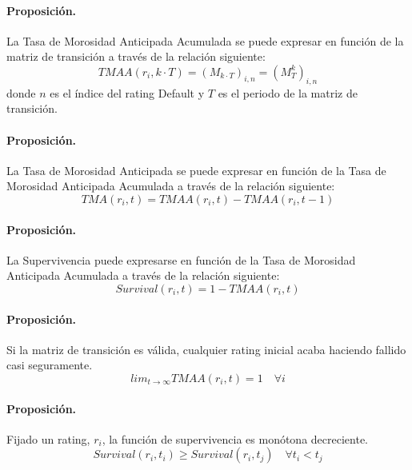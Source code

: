 \paragraph{Proposici\'on.} La Tasa de Morosidad Anticipada Acumulada se 
puede expresar en funci\'on de la matriz de transici\'on a trav\'es de la
relaci\'on siguiente:
\begin{displaymath}
TMAA(r_i,k \cdot T) = (M_{k \cdot T})_{i,n} = (M_{T}^{k})_{i,n}
\end{displaymath}
donde $n$ es el \'indice del rating Default y $T$ es el periodo de la matriz
de transici\'on.

\paragraph{Proposici\'on.} La Tasa de Morosidad Anticipada se puede expresar 
en funci\'on de la Tasa de Morosidad Anticipada Acumulada a trav\'es de la
relaci\'on siguiente:
\begin{displaymath}
TMA(r_i, t) =  TMAA(r_i, t) - TMAA(r_i, t-1)
\end{displaymath}

\paragraph{Proposici\'on.} La Supervivencia puede expresarse en funci\'on de
la Tasa de Morosidad Anticipada Acumulada a trav\'es de la relaci\'on siguiente:
\begin{displaymath}
Survival(r_i, t) =  1 - TMAA(r_i, t)
\end{displaymath}

\paragraph{Proposici\'on.} Si la matriz de transici\'on es v\'alida, cualquier 
rating inicial acaba haciendo fallido casi seguramente.
\begin{displaymath}
lim_{t \to \infty} TMAA(r_i, t) =  1 \quad \forall i
\end{displaymath}

\paragraph{Proposici\'on.} Fijado un rating, $r_i$, la funci\'on de 
supervivencia es mon\'otona decreciente.
\begin{displaymath}
Survival(r_i, t_i) \ge Survival(r_i, t_j) \quad \forall t_i < t_j
\end{displaymath}

